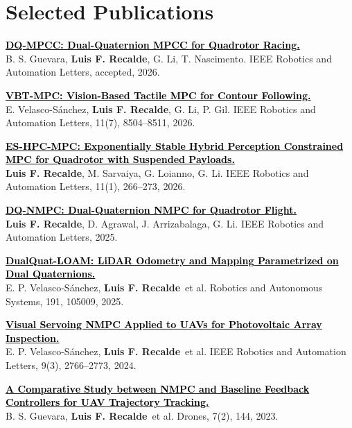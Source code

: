 \documentclass[letterpaper,11pt]{article}
\newcommand{\authorname}{\textcolor{AuthorTeal}{\textbf{Luis F. Recalde}}}
\newcommand{\journal}[1]{\textcolor{JournalPlum}{#1}}
\newcommand{\papertitle}[1]{\textcolor{black}{\textbf{#1}}}
\begin{document}
\section{Selected Publications}
\begin{enumerate}[leftmargin=0.28in, label={[\arabic*]}, itemsep=2pt, parsep=0pt, topsep=3pt]
\small
\item \href{https://arxiv.org/abs/2609.36482}{\papertitle{DQ-MPCC: Dual-Quaternion MPCC for Quadrotor Racing.}}\\
B. S. Guevara, \authorname, G. Li, T. Nascimento. \journal{IEEE Robotics and Automation Letters}, accepted, 2026.
\item \href{https://doi.org/10.1109/LRA.2026.3698362}{\papertitle{VBT-MPC: Vision-Based Tactile MPC for Contour Following.}}\\
E. Velasco-S\'anchez, \authorname, G. Li, P. Gil. \journal{IEEE Robotics and Automation Letters}, 11(7), 8504--8511, 2026.
\item \href{https://doi.org/10.1109/LRA.2025.3632070}{\papertitle{ES-HPC-MPC: Exponentially Stable Hybrid Perception Constrained MPC for Quadrotor with Suspended Payloads.}}\\
\authorname, M. Sarvaiya, G. Loianno, G. Li. \journal{IEEE Robotics and Automation Letters}, 11(1), 266--273, 2026.
\item \href{https://doi.org/10.1109/LRA.2025.3623022}{\papertitle{DQ-NMPC: Dual-Quaternion NMPC for Quadrotor Flight.}}\\
\authorname, D. Agrawal, J. Arrizabalaga, G. Li. \journal{IEEE Robotics and Automation Letters}, 2025.
\item \href{https://doi.org/10.1016/j.robot.2025.105009}{\papertitle{DualQuat-LOAM: LiDAR Odometry and Mapping Parametrized on Dual Quaternions.}}\\
E. P. Velasco-S\'anchez, \authorname\ et al. \journal{Robotics and Autonomous Systems}, 191, 105009, 2025.
\item \href{https://doi.org/10.1109/LRA.2024.3360876}{\papertitle{Visual Servoing NMPC Applied to UAVs for Photovoltaic Array Inspection.}}\\
E. P. Velasco-S\'anchez, \authorname\ et al. \journal{IEEE Robotics and Automation Letters}, 9(3), 2766--2773, 2024.
\item \href{https://doi.org/10.3390/drones7020144}{\papertitle{A Comparative Study between NMPC and Baseline Feedback Controllers for UAV Trajectory Tracking.}}\\
B. S. Guevara, \authorname\ et al. \journal{Drones}, 7(2), 144, 2023.

\end{enumerate}
\end{document}
